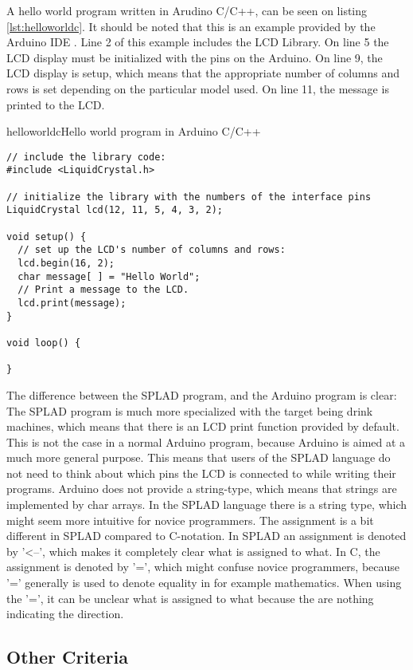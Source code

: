 A hello world program written in Arudino C/C++, can be seen on listing \ref{lst:helloworldc}. It should be noted that this is an example provided by the Arduino IDE \citep{LCDtut}. Line 2 of this example includes the LCD Library. On line 5 the LCD display must be initialized with the pins on the Arduino. On line 9, the LCD display is setup, which means that the appropriate number of columns and rows is set depending on the particular model used. On line 11, the message is printed to the LCD.
 
\begin{code}{helloworldc}{Hello world program in Arduino C/C++}
\begin{lstlisting}
// include the library code:
#include <LiquidCrystal.h>

// initialize the library with the numbers of the interface pins
LiquidCrystal lcd(12, 11, 5, 4, 3, 2);

void setup() {
  // set up the LCD's number of columns and rows: 
  lcd.begin(16, 2);
  char message[ ] = "Hello World";
  // Print a message to the LCD.
  lcd.print(message);
}

void loop() {

}
\end{lstlisting}
\end{code}
The difference between the SPLAD program, and the Arduino program is clear: The SPLAD program is much more specialized with the target being drink machines, which means that there is an LCD print function provided by default. This is not the case in a normal Arduino program, because Arduino is aimed at a much more general purpose. This means that users of the SPLAD language do not need to think about which pins the LCD is connected to while writing their programs. Arduino does not provide a string-type, which means that strings are implemented by char arrays. In the SPLAD language there is a string type, which might seem more intuitive for novice programmers. The assignment is a bit different in SPLAD compared to C-notation. In SPLAD an assignment is denoted by '<--', which makes it completely clear what is assigned to what. In C, the assignment is denoted by '=', which might confuse novice programmers, because '=' generally is used to denote equality in for example mathematics. When using the '=', it can be unclear what is assigned to what because the are nothing indicating the direction.

\subsection{Other Criteria}


